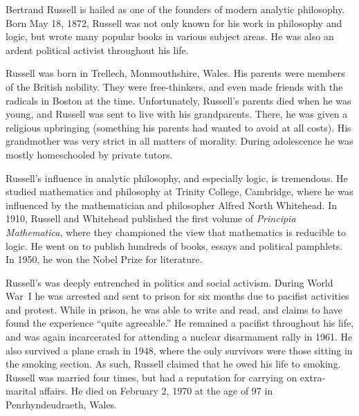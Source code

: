 \documentclass[../../../include/open-logic-section]{subfiles}
\begin{document}


Bertrand Russell is hailed as one of the founders of modern analytic
philosophy. Born May 18, 1872, Russell was not only known for his work
in philosophy and logic, but wrote many popular books in various
subject areas. He was also an ardent political activist throughout his
life.

Russell was born in Trellech, Monmouthshire, Wales. His parents were
members of the British nobility. They were free-thinkers, and even
made friends with the radicals in Boston at the time.  Unfortunately,
Russell's parents died when he was young, and Russell was sent to live
with his grandparents. There, he was given a religious upbringing
(something his parents had wanted to avoid at all costs). His
grandmother was very strict in all matters of morality. During
adolescence he was mostly homeschooled by private tutors.

Russell's influence in analytic philosophy, and especially logic, is
tremendous. He studied mathematics and philosophy at Trinity College,
Cambridge, where he was influenced by the mathematician and
philosopher Alfred North Whitehead.  In 1910, Russell and Whitehead
published the first volume of \emph{Principia Mathematica}, where they
championed the view that mathematics is reducible to logic. He went on
to publish hundreds of books, essays and political pamphlets. In 1950,
he won the Nobel Prize for literature.

Russell's was deeply entrenched in politics and social
activism. During World War~I he was arrested and sent to prison for
six months due to pacifist activities and protest. While in prison, he
was able to write and read, and claims to have found the experience
``quite agreeable.'' He remained a pacifist throughout his life, and
was again incarcerated for attending a nuclear disarmament rally in
1961. He also survived a plane crash in 1948, where the only survivors
were those sitting in the smoking section. As such, Russell claimed
that he owed his life to smoking. Russell was married four times, but
had a reputation for carrying on extra-marital affairs.  He died on
February 2, 1970 at the age of 97 in Penrhyndeudraeth, Wales.
\end{document}
